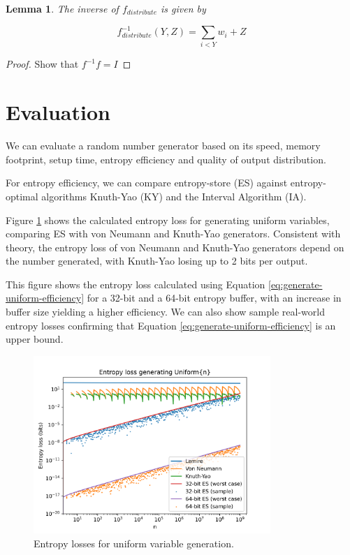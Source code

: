 \documentclass[12pt]{article}
\newtheorem{lemma}{Lemma}
\begin{document}
\begin{lemma}
The inverse of $f_{distribute}$ is given by

    \begin{equation}
    f^{-1}_{distribute}(Y,Z) = \sum_{i<Y}w_i + Z
    \end{equation}
\end{lemma}

\begin{proof}
    Show that $f^{-1}f= I$

\end{proof}




\section {Evaluation}

We can evaluate a random number generator based on its speed, memory footprint, setup time, entropy efficiency and quality of output distribution. \cite{saad2025}

For entropy efficiency, we can compare entropy-store (ES) against entropy-optimal algorithms Knuth-Yao (KY) and the Interval Algorithm (IA).

Figure \ref{fig:uniform-losses} shows the calculated entropy loss for generating uniform variables, comparing ES with von Neumann and Knuth-Yao generators. Consistent with theory, the entropy loss of von Neumann and Knuth-Yao generators depend on the number generated, with Knuth-Yao losing up to 2 bits per output.

This figure shows the entropy loss calculated using Equation \ref{eq:generate-uniform-efficiency} for a 32-bit and a 64-bit entropy buffer, with an increase in buffer size yielding a higher efficiency. We can also show sample real-world entropy losses confirming that Equation \ref{eq:generate-uniform-efficiency} is an upper bound.

\begin{figure}[ht]
\centering
\includegraphics[width=0.8\textwidth]{uniform_losses.png}
\caption{Entropy losses for uniform variable generation.}
\label{fig:uniform-losses}
\end{figure}
\end{document}
